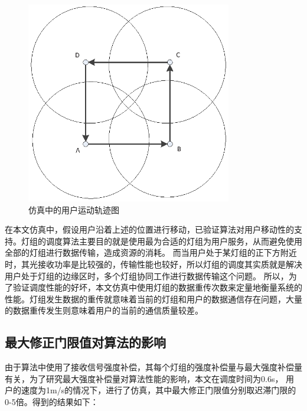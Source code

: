 \begin{figure}[htbp]
    \centering
	\includegraphics[width=0.8\textwidth]{figures/chapter-4/DistributionUserMove.eps}
	\caption{仿真中的用户运动轨迹图}
	\label{fig:distribution-user-move}
\end{figure}

在本文仿真中，假设用户沿着上述的位置进行移动，已验证算法对用户移动性的支持。灯组的调度算法主要目的就是使用最为合适的灯组为用户服务，从而避免使用全部的灯组进行数据传输，造成资源的消耗。
而当用户处于某灯组的正下方附近时，其光接收功率是比较强的，传输性能也较好，所以灯组的调度其实质就是解决用户处于灯组的边缘区时，多个灯组协同工作进行数据传输这个问题。
所以，为了验证调度性能的好坏，本文仿真中使用灯组的数据重传次数来定量地衡量系统的性能。灯组发生数据的重传就意味着当前的灯组和用户的数据通信存在问题，大量的数据重传发生则意味着用户的当前的通信质量较差。

\subsection{最大修正门限值对算法的影响}
由于算法中使用了接收信号强度补偿，其每个灯组的强度补偿量与最大强度补偿量有关，为了研究最大强度补偿量对算法性能的影响，本文在调度时间为0.6s，
用户的速度为1m/s的情况下，进行了仿真，其中最大修正门限值分别取迟滞门限的0-5倍。得到的结果如下：

